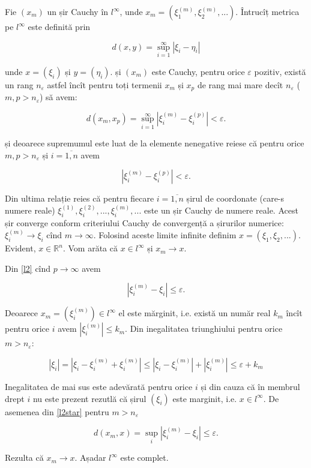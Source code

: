 \documentclass[a4paper,12pt]{article}
\theoremstyle{change}
\newenvironment{proof}{{\bf Demonstrație:} }{}
\begin{document}
\begin{proof}

Fie $(x_m)$ un șir Cauchy în $l^\infty$, unde $x_m=(\xi_1^{(m)},\xi_2^{(m)},...)$. Întrucîț metrica pe $l^\infty$ este definită prin

\[
  d(x,y) = \sup_{i=1}^{\infty} |\xi_i - \eta_i|
\]

unde $x=(\xi_i)$ și $y=(\eta_i)$.  și $(x_m)$ este Cauchy, pentru orice $\varepsilon$ pozitiv, există un rang $n_{\varepsilon}$ astfel încît pentru toți termenii $x_m$ și $x_p$ de rang mai mare decît $n_{\varepsilon}$ ($m,p>n_{\varepsilon}$) să avem:

\[
d(x_m,x_p) = \sup_{i=1}^{\infty} |\xi_i^{(m)} - \xi_i^{(p)}| < \varepsilon.
\]

și deoarece supremumul este luat de la elemente nenegative reiese că pentru orice $m,p>n_\varepsilon$ și $i=\overline{1,n}$ avem

\[
\label{l2}
|\xi_i^{(m)} - \xi_i^{(p)}| < \varepsilon.
\]

Din ultima relație reies că pentru fiecare $i=\overline{1,n}$ șirul de coordonate (care-s numere reale) $\xi_i^{(1)}, \xi_i^{(2)}, ..., \xi_i^{(m)}, ...$ este un șir Cauchy de numere reale. Acest șir converge conform criteriului Cauchy de convergență a șirurilor numerice: $\xi_i^{(m)}\to \xi_i$ cînd $m\to\infty$. Folosind aceste limite infinite definim $x=(\xi_1,\xi_2,...)$. Evident, $x\in\mathbb{R}^n$. Vom arăta că $x\in l^\infty$ și $x_m\to x$.

Din \ref{l2} cînd $p\to\infty$ avem

\[
\label{l2star}
|\xi_i^{(m)} - \xi_i| \leq \varepsilon.
\]

Deoarece $x_m=(\xi_i^{(m)})\in l^\infty$ el este mărginit, i.e. există un număr real $k_m$ încît pentru orice $i$ avem $|\xi_i^{(m)}|\leq k_m$. Din inegalitatea triunghiului pentru orice $m>n_\varepsilon$:

\[
|\xi_i|=|\xi_i-\xi_i^{(m)}+\xi_i^{(m)}|\leq |\xi_i-\xi_i^{(m)}|+|\xi_i^{(m)}|\leq\varepsilon+k_m
\]

Inegalitatea de mai sus este adevărată pentru orice $i$ și din cauza că în membrul drept $i$ nu este prezent rezutlă că șirul $(\xi_i)$ este marginit, i.e. $x\in l^\infty$. De asemenea din \ref{l2star} pentru $m>n_\varepsilon$

\[
d(x_m,x)=\sup_i |\xi_i^{(m)}-\xi_i|\leq \varepsilon.
\]

Rezulta că $x_m\to x$. Așadar $l^\infty$ este complet.

\end{proof}
\end{document}
